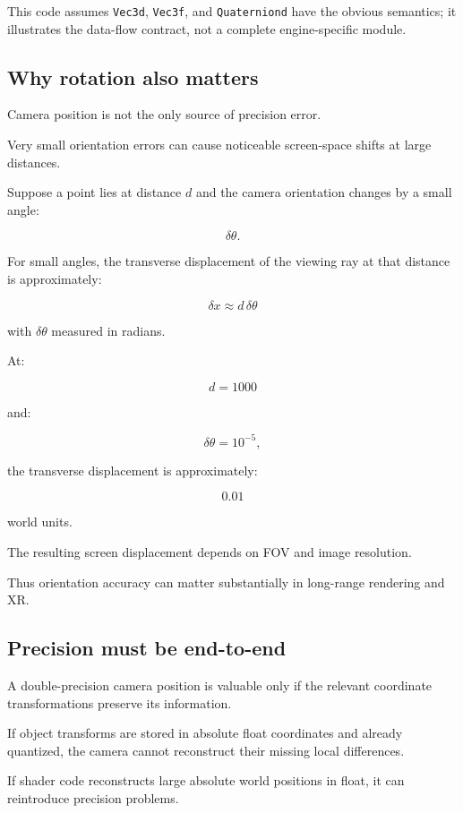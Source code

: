 This code assumes \texttt{Vec3d}, \texttt{Vec3f}, and \texttt{Quaterniond} have the obvious semantics; it illustrates the data-flow contract, not a complete engine-specific module.

\subsection{Why rotation also matters}\label{02-foundations-ii-ch036-why-rotation-also-matters}

Camera position is not the only source of precision error.

Very small orientation errors can cause noticeable screen-space shifts at large distances.

Suppose a point lies at distance \(d\) and the camera orientation changes by a small angle:

\[
 \delta\theta.
\]

For small angles, the transverse displacement of the viewing ray at that distance is approximately:

\[
 \boxed{ \delta x\approx d\,\delta\theta }
\]

with \(\delta\theta\) measured in radians.

At:

\[
 d=1000
\]

and:

\[
 \delta\theta=10^{-5},
\]

the transverse displacement is approximately:

\[
 0.01
\]

world units.

The resulting screen displacement depends on FOV and image resolution.

Thus orientation accuracy can matter substantially in long-range rendering and XR.

\subsection{Precision must be end-to-end}\label{02-foundations-ii-ch036-precision-must-be-end-to-end}

A double-precision camera position is valuable only if the relevant coordinate transformations preserve its information.

If object transforms are stored in absolute float coordinates and already quantized, the camera cannot reconstruct their missing local differences.

If shader code reconstructs large absolute world positions in float, it can reintroduce precision problems.

